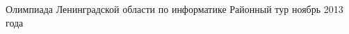 

\contest
{Олимпиада Ленинградской области по информатике}
{Районный тур}
{ноябрь 2013 года}




\raggedbottom

\def\newpageafterlegend{\relax}
\newpage
{}
\newpage
{}
\newpage
{}
\newpage
{}


